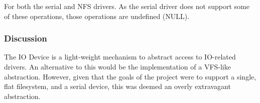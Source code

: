 \documentclass[a4paper,12pt]{article}
\begin{document}
For both the serial and NFS drivers.  As the serial driver does not support
some of these operations, those operations are undefined (NULL).

\subsubsection{Discussion}
The IO Device is a light-weight mechanism to abstract access to IO-related
drivers.  An alternative to this would be the implementation of a VFS-like
abstraction.  However, given that the goals of the project were to support a
single, flat filesystem, and a serial device, this was deemed an overly
extravagant abstraction.
\end{document}
